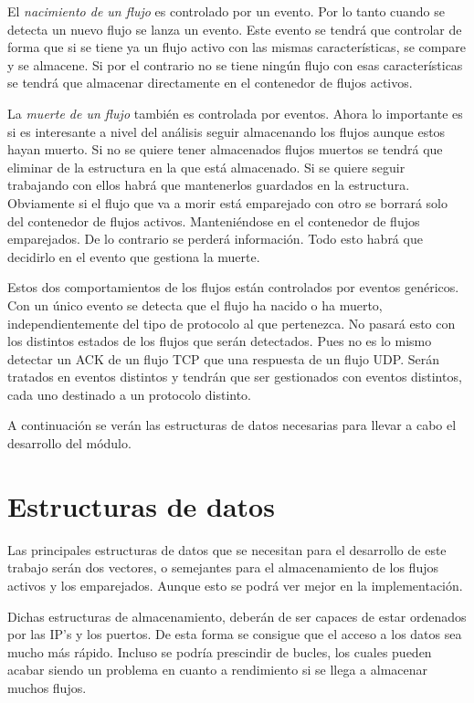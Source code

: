 \intro El \textit{nacimiento de un flujo} es controlado por un evento. Por lo tanto cuando se detecta un nuevo 
flujo se lanza un evento. Este evento se tendrá que controlar de forma que si se tiene ya un flujo activo con las 
mismas características, se compare y se almacene. Si por el contrario no se tiene ningún flujo con esas 
características se tendrá que almacenar directamente en el contenedor de flujos activos.

\intro La \textit{muerte de un flujo} también es controlada por eventos. Ahora lo importante es si es interesante 
a nivel del análisis seguir almacenando los flujos aunque estos hayan muerto. Si no se quiere tener almacenados 
flujos muertos se tendrá que eliminar de la estructura en la que está almacenado. Si se quiere seguir trabajando 
con ellos habrá que mantenerlos guardados en la estructura. Obviamente si el flujo que va a morir está emparejado 
con otro se borrará solo del contenedor de flujos activos. Manteniéndose en el contenedor de flujos emparejados. De 
lo contrario se perderá información. Todo esto habrá que decidirlo en el evento que gestiona la muerte.

\intro Estos dos comportamientos de los flujos están controlados por eventos genéricos. Con un único evento se 
detecta que el flujo ha nacido o ha muerto, independientemente del tipo de protocolo al que pertenezca. No pasará 
esto con los distintos estados de los flujos que serán detectados. Pues no es lo mismo detectar un ACK de un flujo 
TCP que una respuesta de un flujo UDP. Serán tratados en eventos distintos y tendrán que ser gestionados con 
eventos distintos, cada uno destinado a un protocolo distinto. 

\intro A continuación se verán las estructuras de datos necesarias para llevar a cabo el desarrollo del módulo.

\section{Estructuras de datos}

Las principales estructuras de datos que se necesitan para el desarrollo de este trabajo serán dos vectores, o 
semejantes para el almacenamiento de los flujos activos y los emparejados. Aunque esto se podrá ver mejor en la 
implementación.

\intro Dichas estructuras de almacenamiento, deberán de ser capaces de estar ordenados por las IP's y los puertos. 
De esta forma se consigue que el acceso a los datos sea mucho más rápido. Incluso se podría prescindir de bucles, 
los cuales pueden acabar siendo un problema en cuanto a rendimiento si se llega a almacenar muchos flujos.

